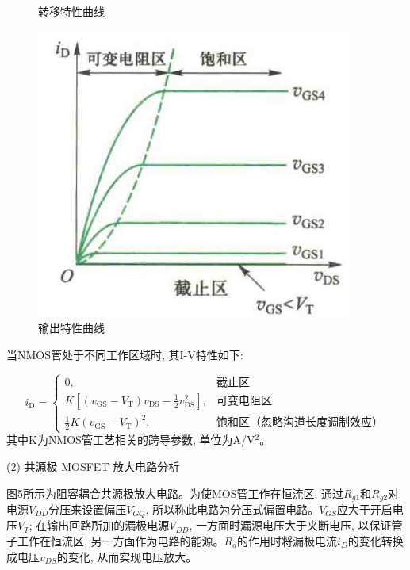 \documentclass[10pt, a4paper]{article} %
\begin{document}
\begin{figure}[ht]
\begin{minipage}[ht]{0.3\textwidth}
        \caption{转移特性曲线}
        \label{fig:side:c}
    \end{minipage}
    \hfill
    \begin{minipage}[ht]{0.3\textwidth}
        \centering
        \includegraphics[width=\linewidth]{image/4.png}
        \caption{输出特性曲线}
        \label{fig:side:d}
    \end{minipage}
    
\end{figure}

\newpage

当NMOS管处于不同工作区域时, 其I-V特性如下:

$$
i_{\mathrm{D}} = 
\begin{cases} 
0, & \text{截止区} \\
K \left[ (v_{\mathrm{GS}} - V_{\mathrm{T}}) v_{\mathrm{DS}} - \frac{1}{2} v_{\mathrm{DS}}^2 \right], & \text{可变电阻区} \\
\frac{1}{2} K (v_{\mathrm{GS}} - V_{\mathrm{T}})^2, & \text{饱和区（忽略沟道长度调制效应）}
\end{cases}
$$ 
其中K为NMOS管工艺相关的跨导参数, 单位为A/V$^2$。


(2) 共源极 MOSFET 放大电路分析
\vspace{0.5cm}

图5所示为阻容耦合共源极放大电路。为使MOS管工作在恒流区, 通过$R_{g1}$和$R_{g2}$对电源$V_{DD}$分压来设置偏压$V_{GQ}$, 所以称此电路为分压式偏置电路。$V_{GS}$应大于开启电压$V_{T}$; 在输出回路所加的漏极电源$V_{DD}$, 一方面时漏源电压大于夹断电压, 以保证管子工作在恒流区, 另一方面作为电路的能源。$R_d$的作用时将漏极电流$i_D$的变化转换成电压$v_{DS}$的变化, 从而实现电压放大。
\end{document}
